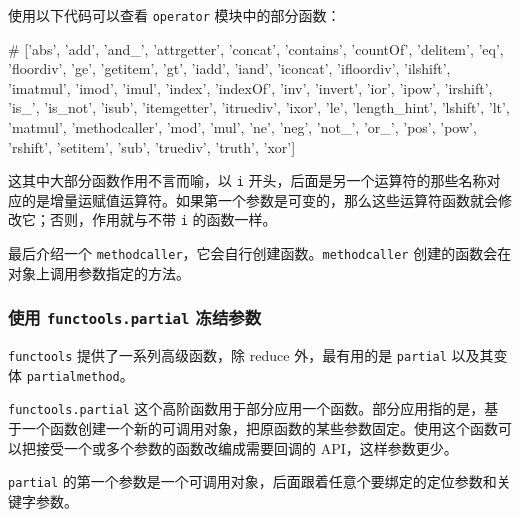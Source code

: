 

使用以下代码可以查看 \texttt{operator} 模块中的部分函数：
\begin{python}
# ['abs', 'add', 'and_', 'attrgetter', 'concat', 'contains', 'countOf', 'delitem', 'eq', 'floordiv', 'ge', 'getitem', 'gt', 'iadd', 'iand', 'iconcat', 'ifloordiv', 'ilshift', 'imatmul', 'imod', 'imul', 'index', 'indexOf', 'inv', 'invert', 'ior', 'ipow', 'irshift', 'is_', 'is_not', 'isub', 'itemgetter', 'itruediv', 'ixor', 'le', 'length_hint', 'lshift', 'lt', 'matmul', 'methodcaller', 'mod', 'mul', 'ne', 'neg', 'not_', 'or_', 'pos', 'pow', 'rshift', 'setitem', 'sub', 'truediv', 'truth', 'xor']
\end{python}

这其中大部分函数作用不言而喻，以 \texttt{i} 开头，后面是另一个运算符的那些名称对应的是增量运赋值运算符。如果第一个参数是可变的，那么这些运算符函数就会修改它；否则，作用就与不带 \texttt{i} 的函数一样。

最后介绍一个 \texttt{methodcaller}，它会自行创建函数。\texttt{methodcaller} 创建的函数会在对象上调用参数指定的方法。



\subsubsection{使用 \texttt{functools.partial} 冻结参数}

\texttt{functools} 提供了一系列高级函数，除 \textrm{reduce} 外，最有用的是 \texttt{partial} 以及其变体 \texttt{partialmethod}。

\texttt{functools.partial} 这个高阶函数用于部分应用一个函数。部分应用指的是，基于一个函数创建一个新的可调用对象，把原函数的某些参数固定。使用这个函数可以把接受一个或多个参数的函数改编成需要回调的 API，这样参数更少。



\texttt{partial} 的第一个参数是一个可调用对象，后面跟着任意个要绑定的定位参数和关键字参数。








\newpage